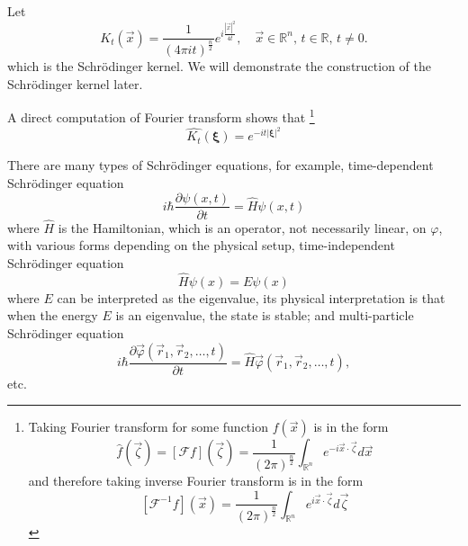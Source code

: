 \documentclass[a4paper,12pt]{report}
\begin{document}
Let
\[
K_t(\vec{x}) = \frac{1}{(4\pi it)^{\frac{n}{2}}} e^{i \frac{|\vec{x}|^2}{4t}}, \quad \vec{x} \in \mathbb{R}^n, \, t \in \mathbb{R}, \, t \neq 0. \tag{4}
\]
which is the Schr\"odinger kernel. We will demonstrate the construction of the Schr\"odinger kernel later. 

A direct computation of Fourier transform shows that \footnote{Taking Fourier transform for some function \(f(\vec{x})\) is in the form 
\[\hat{f}(\vec{\zeta}) = [\mathcal{F}f](\vec{\zeta}) = \frac{1}{(2\pi)^{\frac{n}{2}}} \int_{\mathbb{R}^n} e^{-i \vec{x} \cdot \vec{\zeta} } d\vec{x}\]
and therefore taking inverse Fourier transform is in the form 
\[[\mathcal{F}^{-1}f](\vec{x}) = \frac{1}{(2\pi)^{\frac{n}{2}}} \int_{\mathbb{R}^n} e^{i \vec{x} \cdot \vec{\zeta} } d\vec{\zeta}\]}
\[\widehat{K_t}(\boldsymbol{\xi}) = e^{-it|\boldsymbol{\xi}|^2} \tag{5}\]

There are many types of Schr\"odinger equations, for example, time-dependent Schrödinger equation
    \[
        i\hbar \frac{\partial \psi(x,t)}{\partial t} = \hat{H}\psi(x,t)
    \]
where \(\hat{H}\) is the Hamiltonian, which is an operator, not necessarily linear, on \(\varphi\), with various forms depending on the physical setup, time-independent Schrödinger equation
    \[
        \hat{H}\psi(x) = E\psi(x)
    \]
where \(E\) can be interpreted as the eigenvalue, its physical interpretation is that when the energy \(E\) is an eigenvalue, the state is stable; and multi-particle Schrödinger equation
    \[
        i\hbar \frac{\partial \vec{\varphi}(\vec{r}_1, \vec{r}_2, \dots, t)}{\partial t} = \hat{H}\vec{\varphi}(\vec{r}_1, \vec{r}_2, \dots, t),
    \]
etc. 
\end{document}

